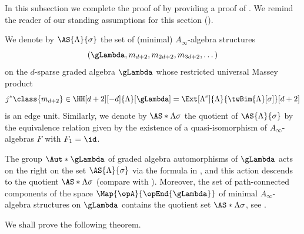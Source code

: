 \documentclass[a4paper]{amsart}
\begin{document}
In this subsection we complete the proof of
 by providing a proof of
. We remind the reader of our standing assumptions
for this section ().

\begin{notation}
  We denote by $\AS{\Lambda}{\sigma}$ the set of (minimal) $A_\infty$-algebra structures
  \[
    (\gLambda,m_{d+2},m_{2d+2},m_{3d+2},\dots)
  \]
  on the $d$-sparse graded algebra $\gLambda$ whose restricted universal Massey
  product
  \[
    j^*\class{m_{d+2}}\in\HH[d+2][-d]{\Lambda}[\gLambda]=\Ext[\Lambda^e]{\Lambda}{\twBim{\Lambda}[\sigma]}[d+2]
  \]
  is an edge unit. Similarly, we denote by $\AS*{\Lambda}{\sigma}$ the quotient
  of $\AS{\Lambda}{\sigma}$ by the equivalence relation given by the existence
  of a quasi-isomorphism of $A_\infty$-algebras $F$ with 
  $F_1=\id$.
\end{notation}

\begin{remark}
  The group $\Aut*{\gLambda}$ of graded algebra automorphisms of $\gLambda$ acts
  on the right on the set $\AS{\Lambda}{\sigma}$ via the formula in
  , and this action descends to the quotient
  $\AS*{\Lambda}{\sigma}$ (compare with ). Moreover, the set of
  path-connected components of the space $\Map{\opA}{\opEnd{\gLambda}}$ of
  minimal $A_\infty$-algebra structures on $\gLambda$ contains the quotient set
  $\AS*{\Lambda}{\sigma}$, see \cite[Prop.~6.9]{Mur20b}.
\end{remark}

We shall prove the following theorem.
\end{document}
